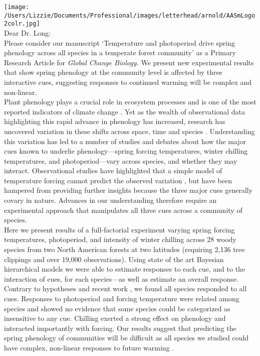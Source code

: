 \documentclass[11pt,a4paper]{article}
\begin{document}
\noindent \texttt{[image: /Users/Lizzie/Documents/Professional/images/letterhead/arnold/AASmLogo2colr.jpg]}
\vspace{1ex}\\

\noindent Dear Dr. Long: %
\vspace{1.5ex}\\
\noindent Please consider our manuscript `Temperature and photoperiod drive spring phenology across all species in a temperate forest community' as a Primary Research Article for \emph{Global Change Biology.} We present new experimental results that show spring phenology at the community level is affected by three interactive cues, suggesting responses to continued warming will be complex and non-linear.
\vspace{1.5ex}\\
Plant phenology plays a crucial role in ecosystem processes and is one of the most reported indicators of climate change \citep{Cleland:2007aa,piao2017,sippel2016}. Yet as the wealth of observational data highlighting this rapid advance in phenology has increased, research has uncovered variation in these shifts across space, time and species \citep{Rutishauser:2008fu,Wolkovich:2012aa,fu2015}. Understanding this variation has led to a number of studies and debates \citep[e.g.,][]{Korner:2010,Chuine:xb} about how the major cues known to underlie phenology---spring forcing temperatures, winter chilling temperatures, and photoperiod---vary across species, and whether they may interact. Observational studies have highlighted that a simple model of temperature forcing cannot predict the observed variation \citep{Rutishauser:2008fu,fu2015,carter2017}, but have been hampered from providing further insights because the three major cues generally covary in nature. Advances in our understanding therefore require an experimental approach that manipulates all three cues across a community of species. 
\vspace{1.5ex}\\
Here we present results of a full-factorial experiment varying spring forcing temperatures, photoperiod, and intensity of winter chilling across 28 woody species from two North American forests at two latitudes (requiring 2,136 tree clippings and over 19,000 observations). Using state of the art Bayesian hierarchical models we were able to estimate responses to each cue, and to the interaction of cues, for each species---as well as estimate an overall response. Contrary to hypotheses and recent work \citep{Korner:2010,laube2014gcb,zohner2016ncc}, we found all species responded to all cues. Responses to photoperiod and forcing temperature were related among species and showed no evidence that some species could be categorized as insensitive to any cue. Chilling exerted a strong effect on phenology and interacted importantly with forcing. Our results suggest that predicting the spring phenology of communities will be difficult as all species we studied could have complex, non-linear responses to future warming \citep{Chuine:1999aa}. 
\end{document}
